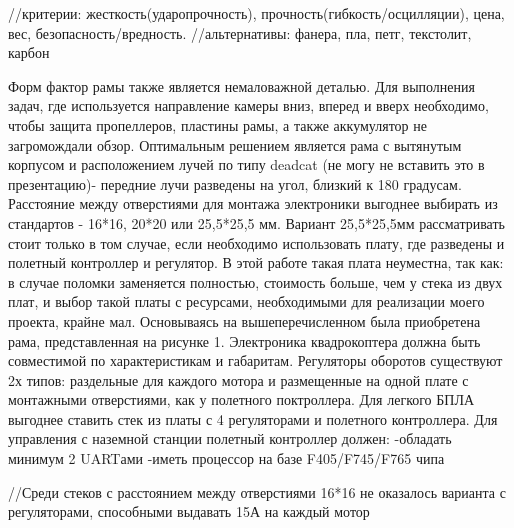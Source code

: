 //критерии: жесткость(ударопрочность), прочность(гибкость/осцилляции), цена, вес, безопасность/вредность.
//альтернативы: фанера, пла, петг, текстолит, карбон

Форм фактор рамы также является немаловажной деталью. Для выполнения задач, где используется направление камеры вниз, вперед и вверх необходимо, чтобы защита пропеллеров, пластины рамы, а также аккумулятор не загромождали обзор. Оптимальным решением является рама с вытянутым корпусом и расположением лучей по типу deadcat (не могу не вставить это в презентацию)- передние лучи разведены на угол, близкий к 180 градусам. Расстояние между отверстиями для монтажа электроники выгоднее выбирать из стандартов - 16*16, 20*20 или 25,5*25,5 мм. Вариант 25,5*25,5мм рассматривать стоит только в том случае, если необходимо использовать плату, где разведены и полетный контроллер и регулятор. В этой работе такая плата неуместна, так как: в случае поломки заменяется полностью, стоимость больше, чем у стека из двух плат, и выбор такой платы с ресурсами, необходимыми для реализации моего проекта, крайне мал. Основываясь на вышеперечисленном была приобретена рама, представленная на рисунке 1.
Электроника квадрокоптера должна быть совместимой по характеристикам и габаритам. Регуляторы оборотов существуют 2х типов: раздельные для каждого мотора и размещенные на одной плате с монтажными отверстиями, как у полетного поктроллера. Для легкого БПЛА выгоднее ставить стек из платы с 4 регуляторами и полетного контроллера. 
Для управления с наземной станции полетный контроллер должен:
-обладать минимум 2 UARTами
-иметь процессор на базе F405/F745/F765 чипа

//Среди стеков с расстоянием между отверстиями 16*16 не оказалось варианта с регуляторами, способными выдавать 15А на каждый мотор




